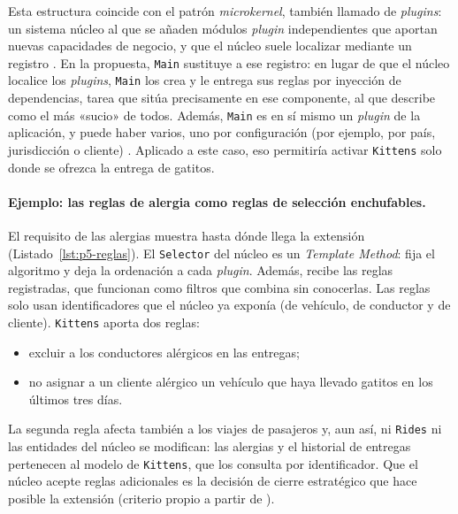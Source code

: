 Esta estructura coincide con el patrón \emph{microkernel}, también llamado de
\emph{plugins}: un sistema núcleo al que se añaden módulos \emph{plugin} independientes
que aportan nuevas capacidades de negocio, y que el núcleo suele localizar mediante un
registro \parencite[21--22]{richards2015}. En la propuesta, \texttt{Main} sustituye a ese
registro: en lugar de que el núcleo localice los \emph{plugins}, \texttt{Main} los crea y
le entrega sus reglas por inyección de dependencias, tarea que
\textcite[232]{martin2017} sitúa precisamente en ese componente, al que describe como el
más «sucio» de todos. Además,
\texttt{Main} es en sí mismo un \emph{plugin} de la aplicación, y puede haber varios, uno
por configuración (por ejemplo, por país, jurisdicción o cliente)
\parencite[237]{martin2017}. Aplicado a este caso, eso permitiría activar
\texttt{Kittens} solo donde se ofrezca la entrega de gatitos.

\paragraph{Ejemplo: las reglas de alergia como reglas de selección enchufables.}
El requisito de las alergias muestra hasta dónde llega la extensión
(Listado~\ref{lst:p5-reglas}). El \texttt{Selector} del núcleo es un \emph{Template
Method}: fija el algoritmo y deja la ordenación a cada \emph{plugin}. Además, recibe las
reglas registradas, que funcionan como filtros que combina sin conocerlas. Las reglas
solo usan identificadores que el núcleo ya exponía (de vehículo, de conductor y de
cliente). \texttt{Kittens} aporta dos reglas:
\begin{itemize}
  \item excluir a los conductores alérgicos en las entregas;
  \item no asignar a un cliente alérgico un vehículo que haya llevado gatitos en los
        últimos tres días.
\end{itemize}
La segunda regla afecta también a los viajes de pasajeros y, aun así, ni \texttt{Rides}
ni las entidades del núcleo se modifican: las alergias y el historial de entregas
pertenecen al modelo de \texttt{Kittens}, que los consulta por identificador. Que el
núcleo acepte reglas adicionales es la decisión de cierre estratégico que hace posible la
extensión (criterio propio a partir de \cite[106]{martin2017}).

